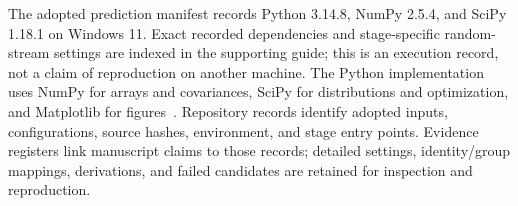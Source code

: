 The adopted prediction manifest records Python 3.14.8, NumPy 2.5.4, and SciPy 1.18.1 on Windows 11. Exact recorded dependencies and stage-specific random-stream settings are indexed in the supporting guide; this is an execution record, not a claim of reproduction on another machine. The Python implementation uses NumPy for arrays and covariances, SciPy for distributions and optimization, and Matplotlib for figures~\cite{numpy2020,scipy2020,matplotlib2007}. Repository records identify adopted inputs, configurations, source hashes, environment, and stage entry points. Evidence registers link manuscript claims to those records; detailed settings, identity/group mappings, derivations, and failed candidates are retained for inspection and reproduction.
